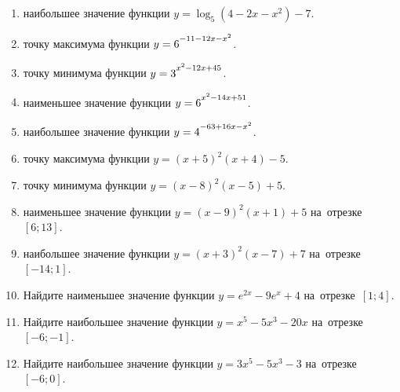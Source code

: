 \documentclass[a4paper,10pt]{article}
\begin{document}
\begin{enumerate}
\item {} наибольшее значение функции $y=\log_5\left(4-2x-x^2\right)-7$.

\item {} точку максимума функции $y=6\strut^{-11-12x-x^2}$.

\item {} точку минимума функции $y=3\strut^{x^2-12x+45}$.

\item {} наименьшее значение функции $y=6\strut^{x^2-14x+51}$.

\item {} наибольшее значение функции $y=4\strut^{-63+16x-x^2}$.

\item {} точку максимума функции $y=\left(x+5\right)^2\left(x+4\right)-5$.

\item {} точку минимума функции $y=\left(x-8\right)^2\left(x-5\right)+5$.

\item {} наименьшее значение функции $y=\left(x-9\right)^2\left(x+1\right)+5$ на~отрезке~$\left[6;13\right]$.

\item {} наибольшее значение функции $y=\left(x+3\right)^2\left(x-7\right)+7$ на~отрезке~$\left[-14;1\right]$.

\item Найдите наименьшее значение функции $y=e^{2x}-9e^x+4$ на~отрезке~$\left[1;4\right]$.

\item Найдите наибольшее значение функции $y=x^5-5x^3-20x$ на~отрезке~$\left[-6;-1\right]$.

\item Найдите наибольшее значение функции $y=3x^5-5x^3-3$ на~отрезке~$\left[-6;0\right]$.

\end{enumerate}
\end{document}

